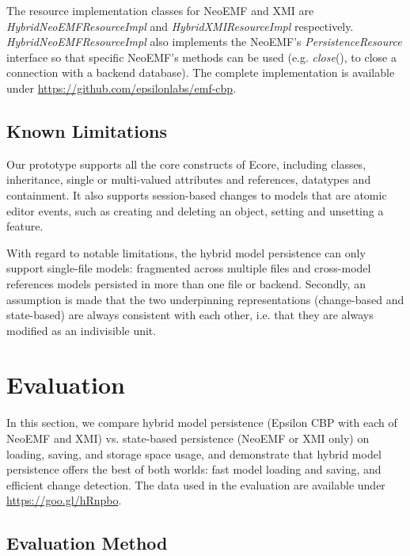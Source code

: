 \documentclass{llncs}
\begin{document}
The resource implementation classes for NeoEMF and XMI are \textit{HybridNeoEMFResourceImpl} and \textit{HybridXMIResourceImpl} respectively. \textit{HybridNeoEMFResourceImpl} also implements the NeoEMF's \textit{PersistenceResource} interface \cite{atlanmod2018persistentResource} so that specific NeoEMF's methods can be used (e.g. \textit{close}(), to close a connection with a backend database). The complete implementation is available under
\url{https://github.com/epsilonlabs/emf-cbp}.

\subsection{Known Limitations}


Our prototype supports all the core constructs of Ecore, including classes, inheritance, single or multi-valued attributes and references, datatypes and containment. It also supports session-based changes to models that are atomic editor events, such as creating and deleting an object, setting and unsetting a feature. 

With regard to notable limitations, the hybrid model persistence can only support single-file models: fragmented across multiple files and cross-model references models persisted in more than one file or backend. Secondly, an assumption is made that the two underpinning representations (change-based and state-based) are always consistent with each other, i.e. that they are always modified as an indivisible unit.

\section{Evaluation}
\label{sec:evaluation}

In this section, we compare hybrid model persistence (Epsilon CBP with each of NeoEMF and XMI) vs. state-based persistence (NeoEMF or XMI only) on loading, saving, and storage space usage,
and demonstrate that hybrid model persistence offers the best of both worlds: fast model loading and saving, and efficient change detection. The data used in the evaluation are available under
\url{https://goo.gl/hRnpbo}.


\subsection{Evaluation Method}
\label{sec:evaluation_method}
\end{document}
